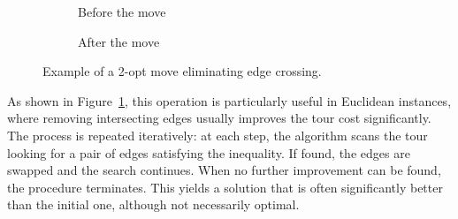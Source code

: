 \begin{figure}[H]
    \centering
    \begin{subfigure}[c]{.4\textwidth}
        \centering
        \caption{Before the move}
    \end{subfigure}
    \hfill
    \begin{subfigure}[c]{.4\textwidth}
        \centering
        \caption{After the move}
    \end{subfigure}
    \caption{Example of a 2-opt move eliminating edge crossing.}
    \label{fig:2optmove}
\end{figure}


As shown in Figure~\ref{fig:2optmove}, this operation is particularly useful in Euclidean instances, where removing intersecting edges 
usually improves the tour cost significantly. The process is repeated iteratively: at each step, the algorithm scans the tour looking 
for a pair of edges satisfying the inequality. If found, the edges are swapped and the search continues. 
When no further improvement can be found, the procedure terminates. This yields a solution that is often significantly better than the initial one, 
although not necessarily optimal.

